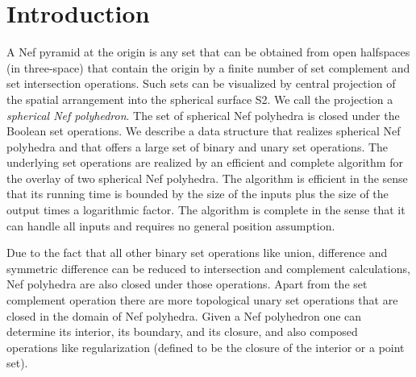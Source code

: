 \section{Introduction}

A Nef pyramid at the origin is any set that can be obtained from open
halfspaces (in three-space) that contain the origin by a finite number
of set complement and set intersection operations. Such sets can be
visualized by central projection of the spatial arrangement into the
spherical surface S2. We call the projection a \emph{spherical Nef
  polyhedron}. The set of spherical Nef polyhedra is closed under the
Boolean set operations.  We describe a data structure that realizes
spherical Nef polyhedra and that offers a large set of binary and
unary set operations. The underlying set operations are realized by an
efficient and complete algorithm for the overlay of two spherical Nef
polyhedra. The algorithm is efficient in the sense that its running
time is bounded by the size of the inputs plus the size of the output
times a logarithmic factor. The algorithm is complete in the sense
that it can handle all inputs and requires no general position
assumption.

Due to the fact that all other binary set operations like union,
difference and symmetric difference can be reduced to intersection and
complement calculations, Nef polyhedra are also closed under those
operations. Apart from the set complement operation there are more
topological unary set operations that are closed in the domain of Nef
polyhedra. Given a Nef polyhedron one can determine its interior, its
boundary, and its closure, and also composed operations like
regularization (defined to be the closure of the interior or a point
set).

